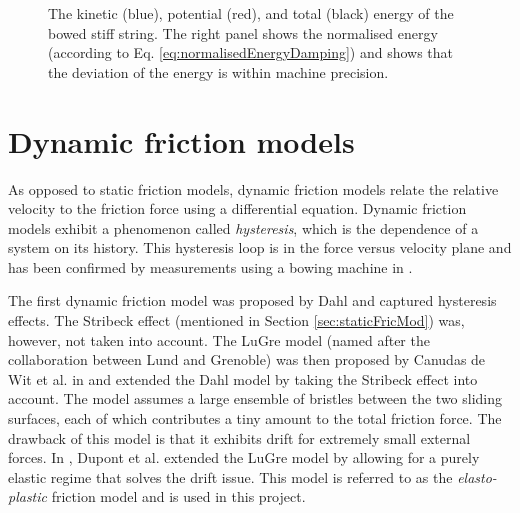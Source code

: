 \begin{figure}[h]
    \centering
      \caption{The kinetic (blue), potential (red), and total (black) energy of the bowed stiff string. The right panel shows the normalised energy (according to Eq. \eqref{eq:normalisedEnergyDamping}) and shows that the deviation of the energy is within machine precision. \label{fig:energyStaticBow}}
\end{figure}

\section{Dynamic friction models}
As opposed to static friction models, dynamic friction models relate the relative velocity to the friction force using a differential equation. Dynamic friction models exhibit a phenomenon called \textit{hysteresis}, which is the dependence of a system on its history. This hysteresis loop is in the force versus velocity plane and has been confirmed by measurements using a bowing machine in \cite{Woodhouse2003}.

The first dynamic friction model was proposed by Dahl \cite{Dahl1968} and captured hysteresis effects. The Stribeck effect (mentioned in Section \ref{sec:staticFricMod}) was, however, not taken into account. The LuGre model (named after the collaboration between Lund and Grenoble) was then proposed by Canudas de Wit et al. in \cite{Canudas1993, Canudas1995} and extended the Dahl model by taking the Stribeck effect into account. The model assumes a large ensemble of bristles between the two sliding surfaces, each of which contributes a tiny amount to the total friction force. The drawback of this model is that it exhibits drift for extremely small external forces. In \cite{Dupont2002}, Dupont et al. extended the LuGre model by allowing for a purely elastic regime that solves the drift issue. This model is referred to as the \textit{elasto-plastic} friction model and is used in this project.

